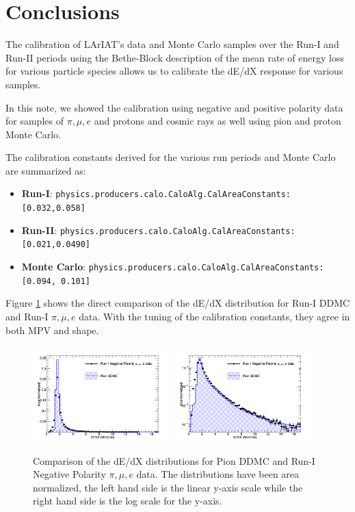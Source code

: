 \section{Conclusions}\label{sec:Conclusion}

The calibration of LArIAT's data and Monte Carlo samples over the Run-I and Run-II periods using the Bethe-Block description of the mean rate of energy loss for various particle species allows us to calibrate the dE/dX response for various samples.

In this note, we showed the calibration using negative and positive polarity data for samples of $\pi, \mu, e$ and protons and cosmic rays as well using pion and proton Monte Carlo.

The calibration constants derived for the various run periods and Monte Carlo are summarized as:

\begin{itemize}
\item \textbf{Run-I}: \verb!physics.producers.calo.CaloAlg.CalAreaConstants: [0.032,0.058]!

\item \textbf{Run-II}: \verb!physics.producers.calo.CaloAlg.CalAreaConstants: [0.021,0.0490]!

\item \textbf{Monte Carlo}: \verb!physics.producers.calo.CaloAlg.CalAreaConstants: [0.094, 0.101]!
\end{itemize}


Figure \ref{fig:PionCompareDataAndMC} shows the direct comparison of the dE/dX distribution for Run-I DDMC and Run-I $\pi, \mu, e$ data. With the tuning of the calibration constants, they agree in both MPV and shape. 

\begin{figure}[htb]
\centering
\includegraphics[width=0.48\textwidth]{images/dEdXPionDataMCcompare.png}
\includegraphics[width=0.48\textwidth]{images/dEdXPionDataMCcompareLog.png}
\caption{Comparison of the dE/dX distributions for Pion DDMC and Run-I Negative Polarity $\pi, \mu, e$ data. The distributions have been area normalized, the left hand side is the linear y-axis scale while the right hand side is the log scale for the y-axis.}
\label{fig:PionCompareDataAndMC}
\end{figure}

